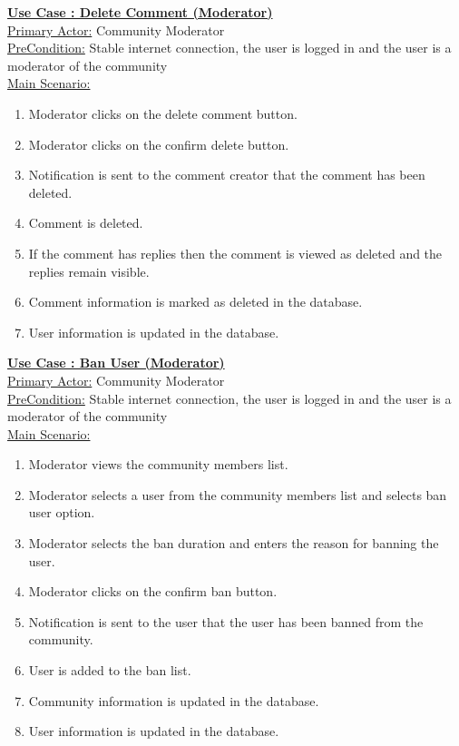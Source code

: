 \documentclass[conference,compsoc]{IEEEtran}
\newcounter{UC}
\newcommand{\nextU}{\stepcounter{UC}\theUC}
\begin{document}
\underline{\textbf{Use Case \nextU: Delete Comment (Moderator)}}\\

\underline{Primary Actor:} Community Moderator\\

\underline{PreCondition:} Stable internet connection, the user is logged in and the user is a moderator of the community\\

\underline{Main Scenario:}\\
\begin{enumerate}
    \item Moderator clicks on the delete comment button.
    \item Moderator clicks on the confirm delete button.
    \item Notification is sent to the comment creator that the comment has been deleted.
    \item Comment is deleted.
    \item If the comment has replies then the comment is viewed as deleted and the replies remain visible.
    \item Comment information is marked as deleted in the database.
    \item User information is updated in the database.
\end{enumerate}

\underline{\textbf{Use Case \nextU: Ban User (Moderator)}}\\

\underline{Primary Actor:} Community Moderator\\

\underline{PreCondition:} Stable internet connection, the user is logged in and the user is a moderator of the community\\

\underline{Main Scenario:}\\
\begin{enumerate}
    \item Moderator views the community members list.
    \item Moderator selects a user from the community members list and selects ban user option.
    \item Moderator selects the ban duration and enters the reason for banning the user.
    \item Moderator clicks on the confirm ban button.
    \item Notification is sent to the user that the user has been banned from the community.
    \item User is added to the ban list.
    \item Community information is updated in the database.
    \item User information is updated in the database.
\end{enumerate}
\end{document}
